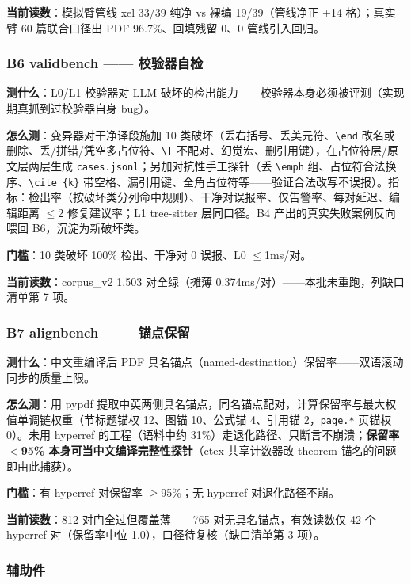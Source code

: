 \textbf{当前读数}：模拟臂管线 xel 33/39 纯净 vs 裸编 19/39（管线净正 +14 格）；真实臂 60 篇联合口径出 PDF 96.7\%、回填残留 0、0 管线引入回归。

\subsubsection{B6 validbench —— 校验器自检}

\textbf{测什么}：L0/L1 校验器对 LLM 破坏的检出能力——校验器本身必须被评测（实现期真抓到过校验器自身 bug）。

\textbf{怎么测}：变异器对干净译段施加 10 类破坏（丢右括号、丢美元符、\verb|\end| 改名或删除、丢/拼错/凭空多占位符、\verb|\[| 不配对、幻觉宏、删引用键），在占位符层/原文层两层生成 \texttt{cases.jsonl}；另加对抗性手工探针（丢 \verb|\emph| 组、占位符合法换序、\verb|\cite {k}| 带空格、漏引用键、全角占位符等——验证合法改写不误报）。指标：检出率（按破坏类分列命中规则）、干净对误报率、仅告警率、每对延迟、编辑距离 $\leq$2 修复建议率；L1 tree-sitter 层同口径。B4 产出的真实失败案例反向喂回 B6，沉淀为新破坏类。

\textbf{门槛}：10 类破坏 100\% 检出、干净对 0 误报、L0 $\leq$1ms/对。

\textbf{当前读数}：corpus\_v2 1{,}503 对全绿（摊薄 0.374ms/对）——本批未重跑，列缺口清单第 7 项。

\subsubsection{B7 alignbench —— 锚点保留}

\textbf{测什么}：中文重编译后 PDF 具名锚点（named-destination）保留率——双语滚动同步的质量上限。

\textbf{怎么测}：用 pypdf 提取中英两侧具名锚点，同名锚点配对，计算保留率与最大权值单调链权重（节标题锚权 12、图锚 10、公式锚 4、引用锚 2，\texttt{page.*} 页锚权 0）。未用 hyperref 的工程（语料中约 31\%）走退化路径、只断言不崩溃；\textbf{保留率 $<$95\% 本身可当中文编译完整性探针}（ctex 共享计数器改 theorem 锚名的问题即由此捕获）。

\textbf{门槛}：有 hyperref 对保留率 $\geq$95\%；无 hyperref 对退化路径不崩。

\textbf{当前读数}：812 对门全过但覆盖薄——765 对无具名锚点，有效读数仅 42 个 hyperref 对（保留率中位 1.0），口径待复核（缺口清单第 3 项）。

\subsubsection{辅助件}


